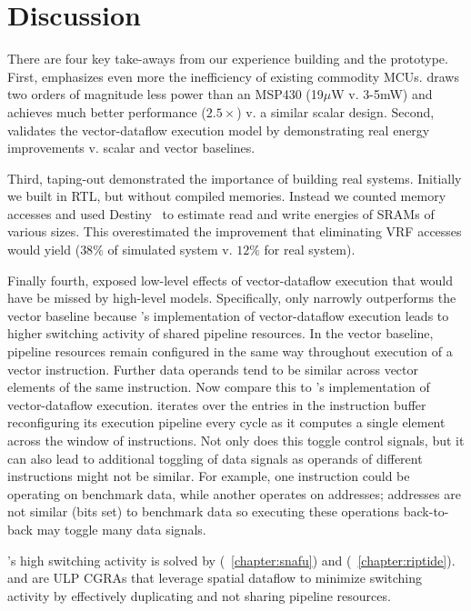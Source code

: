 \section{Discussion}
\label{manic:discuss}
There are four key take-aways from our experience building \manic and the \msilicon prototype.
% 
First, \msilicon emphasizes even more the inefficiency of existing commodity MCUs.
% 
\manic draws two orders of magnitude less power than an MSP430 (19$\mu$W v. 3-5mW) and achieves much better performance ($2.5\times$) v. a similar scalar design.
% 
Second, \msilicon validates the vector-dataflow execution model by demonstrating real energy improvements v. scalar and vector baselines.


Third, taping-out \msilicon demonstrated the importance of building real systems.
% 
Initially we built \manic in RTL, but without compiled memories.
% 
Instead we counted memory accesses and used Destiny~\cite{destiny} to estimate read and write energies of SRAMs of various sizes.
% 
This overestimated the improvement that eliminating VRF accesses would yield ($38\%$ of simulated system v. $12\%$ for real system).

Finally fourth, \msilicon exposed low-level effects of vector-dataflow execution that would have be missed by high-level models.
% 
Specifically, \manic only narrowly outperforms the vector baseline because \manic's implementation of vector-dataflow execution leads to higher switching activity of shared pipeline resources.
% 
In the vector baseline, pipeline resources remain configured in the same way throughout execution of a vector instruction.
% 
Further data operands tend to be similar across vector elements of the same instruction.
% 
Now compare this to \manic's implementation of vector-dataflow execution.
% 
\manic iterates over the entries in the instruction buffer reconfiguring its execution pipeline every cycle as it computes a single element across the window of instructions.
% 
Not only does this toggle control signals, but it can also lead to additional toggling of data signals as operands of different instructions might not be similar.
% 
For example, one instruction could be operating on benchmark data, while another operates on addresses; addresses are not similar (bits set) to benchmark data so executing these operations back-to-back may toggle many data signals. 

\manic's high switching activity is solved by \snafu (~\autoref{chapter:snafu}) and \riptide (~\autoref{chapter:riptide}).
% 
\riptide and \snafu are ULP CGRAs that leverage spatial dataflow to minimize switching activity by effectively duplicating and not sharing pipeline resources.
